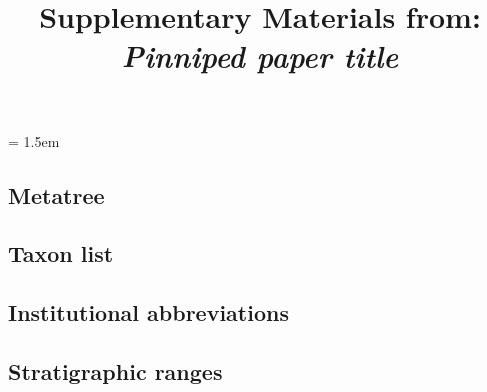 \documentclass[a4paper, 12pt]{article}
\title{Supplementary Materials from: \textit{Pinniped paper title}}
\author{}
\date{}
\begin{document}
\maketitle

\tableofcontents

\parindent = 1.5em
\addtolength{\parskip}{.3em}

\newpage
\begin{landscape}
\section{Metatree}
\subsection{Taxon list}


\end{landscape}

\newpage
\subsection{Institutional abbreviations}


\newpage
\begin{landscape}
\subsection{Stratigraphic ranges}


\end{landscape}

 
\newpage
\end{document}
